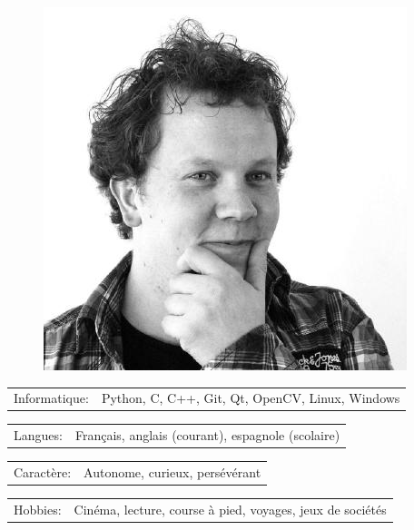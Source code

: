 \documentclass[10pt,A4]{article}
\newcommand{\tzlarrow}{(0,0) -- (0.2,0) -- (0.3,0.2) -- (0.2,0.4) -- (0,0.4) -- (0.1,0.2) -- cycle;}
\newcommand{\larrow}[1]
{\begin{tikzpicture}[scale=0.58]
	 \filldraw[fill=#1!100,draw=#1!100!black]  \tzlarrow
 \end{tikzpicture}
}
\newcommand{\metasection}[2]
{
\begin{tabular*}{1\textwidth}{p{2.4cm} p{11cm}}
\larrow{bgcol}	\normalsize{\textcolor{sectcol}{#1}}&#2\\[12pt]
\end{tabular*}
}
\begin{document}
\pagestyle{fancy}	


\vspace{-20.55pt}


\hspace{-0.25\linewidth}\colorbox{bgcol}{}



\begin{figure}[H]
\begin{flushright}
	\includegraphics[clip,width=0.2\linewidth]{resume/profil_picture.jpg}	%
\end{flushright}
\end{figure}


\vspace{-114pt}

\metasection{Informatique:}{Python, C, C++, Git, Qt, OpenCV, Linux, Windows}
\metasection{Langues:}{Français, anglais (courant), espagnole (scolaire)}
\metasection{Caractère:}{Autonome, curieux, persévérant}
\metasection{Hobbies:}{Cinéma, lecture, course à pied, voyages, jeux de sociétés}
\end{document}
